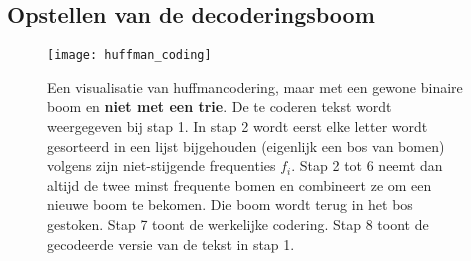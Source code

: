 \subsection{Opstellen van de decoderingsboom}
\begin{figure}[ht]
    \centering
    \texttt{[image: huffman\_coding]}
    \caption{Een visualisatie van huffmancodering, maar met een gewone binaire boom en \textbf{niet met een trie}. De te coderen tekst wordt weergegeven bij stap 1. 
    In stap 2 wordt eerst elke letter wordt gesorteerd in een lijst bijgehouden (eigenlijk een bos van bomen) volgens zijn niet-stijgende frequenties $f_i$. Stap 2 tot 6 neemt dan altijd de twee minst frequente bomen en combineert ze om een nieuwe boom te bekomen. Die boom wordt terug in het bos gestoken. Stap 7 toont de werkelijke codering. Stap 8 toont de gecodeerde versie van de tekst in stap 1.}
    \label{fig:huffman_coding}
\end{figure}
